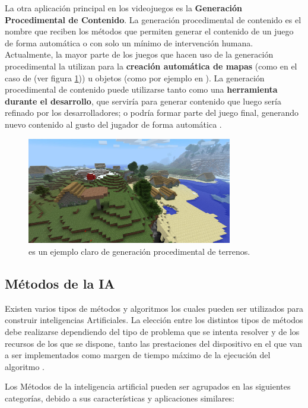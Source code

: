 La otra aplicación principal en los videojuegos es la \textbf{Generación Procedimental de Contenido}. La generación procedimental de contenido es el nombre que reciben los métodos que permiten generar el contenido de un juego de forma automática o con solo un mínimo de intervención humana. Actualmente, la mayor parte de los juegos que hacen uso de la generación procedimental la utilizan para la \textbf{creación automática de mapas} (como en el caso de  (ver figura \ref{minecraft})) u objetos (como por ejemplo en ). La generación procedimental de contenido puede utilizarse tanto como una \textbf{herramienta durante el desarrollo}, que serviría para generar contenido que luego sería refinado por los desarrolladores; o podría formar parte del juego final, generando nuevo contenido al gusto del jugador de forma automática \cite{ai_and_games}.

\begin{figure}[h]
	\includegraphics[width=0.8\textwidth]{images/estadodelarte/ai/minecraft}
	\centering
	\caption{ es un ejemplo claro de generación procedimental de terrenos.}
	\label{minecraft}
\end{figure}

\subsection{Métodos de la IA}
Existen varios tipos de métodos y algoritmos los cuales pueden ser utilizados para construir inteligencias Artificiales. La elección entre los distintos tipos de métodos debe realizarse dependiendo del tipo de problema que se intenta resolver y de los recursos de los que se dispone, tanto las prestaciones del dispositivo en el que van a ser implementados como margen de tiempo máximo de la ejecución del algoritmo \cite{ai_and_games}. 

Los Métodos de la inteligencia artificial pueden ser agrupados en las siguientes categorías, debido a sus características y aplicaciones similares:

